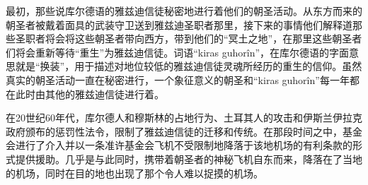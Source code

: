 最初，那些说库尔德语的雅兹迪信徒秘密地进行着他们的朝圣活动。从东方而来的朝圣者被戴着面具的武装守卫送到雅兹迪圣职者那里，接下来的事情他们解释道那些圣职者将会将这些朝圣者带向西方，带到他们的“冥土之地”，在那里这些朝圣者们将会重新等待“重生”为雅兹迪信徒。词语“kiras guhorîn”，在库尔德语的字面意思就是“换装”，用于描述对地位较低的雅兹迪信徒灵魂所经历的重生的信仰。虽然真实的朝圣活动一直在秘密进行，一个象征意义的朝圣和“kiras guhorîn”每一年都在此时由其他的雅兹迪信徒进行着。

在20世纪60年代，库尔德人和穆斯林的占地行为、土耳其人的攻击和伊斯兰伊拉克政府颁布的惩罚性法令，限制了雅兹迪信徒的迁移和传统。在那段时间之中，基金会进行了介入并以一条准许基金会飞机不受限制地降落于该地机场的有利条款的形式提供援助。几乎是与此同时，携带着朝圣者的神秘飞机自东而来，降落在了当地的机场，同时在目的地也出现了那个令人难以捉摸的机场。
